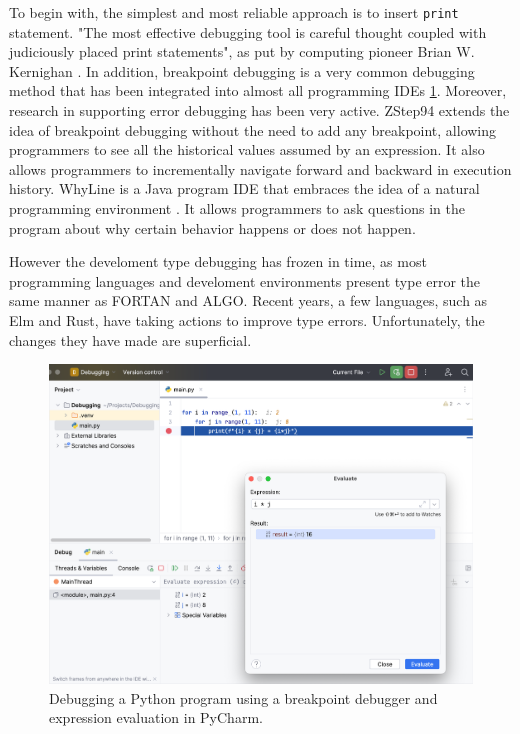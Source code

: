 To begin with, the simplest and most reliable approach is to insert \texttt{print} statement. "The most effective debugging tool is careful thought coupled with judiciously placed print statements", as put by computing pioneer Brian W. Kernighan \cite{Kernighan1978-xs}.  In addition, breakpoint debugging is a very common debugging method that has been integrated into almost all programming IDEs \ref{fig:breakpoint}. Moreover, research in supporting error debugging has been very active. ZStep94 \cite{Lieberman1995-lg} extends the idea of breakpoint debugging without the need to add any breakpoint, allowing programmers to see all the historical values assumed by an expression. It also allows programmers to incrementally navigate forward and backward in execution history. WhyLine \cite{Ko2009-uf} is a Java program IDE that embraces the idea of a natural programming environment \cite{Myers2004-fy}. It allows programmers to ask questions in the program about why certain behavior happens or does not happen. 

However the develoment type debugging has frozen in time, as most programming languages and develoment environments present type error the same manner as FORTAN and ALGO. Recent years, a few languages, such as Elm and Rust, have taking actions to improve type errors. Unfortunately, the changes they have made are superficial.

\begin{figure}[hbt]
  \includegraphics[width=\linewidth]{BreakPoint}
  \caption{
    \label{fig:breakpoint}
    Debugging a Python program using a breakpoint debugger and expression evaluation in PyCharm.
    }
\end{figure}

